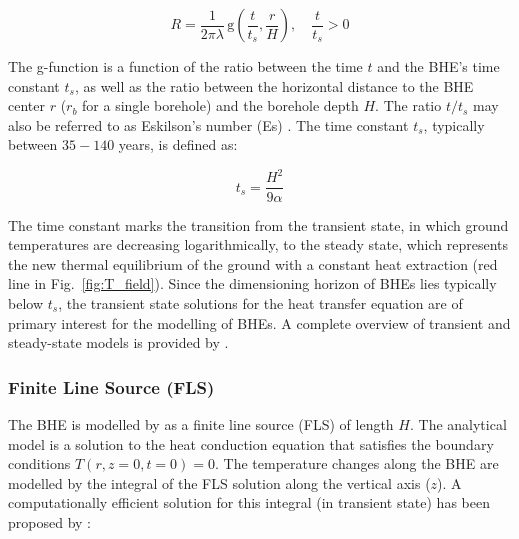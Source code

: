 \begin{equation}
    R = \frac{1}{2 \pi \lambda} \, \mathrm{g}\left( \frac{t}{t_s}, \frac{r}{H} \right), \quad \frac{t}{t_s} > 0
\end{equation}

The g-function is a function of the ratio between the time $t$ and the BHE's time constant $t_s$, as well as the ratio between the horizontal distance to the BHE center $r$ ($r_b$ for a single borehole) and the borehole depth $H$. The ratio $t/t_s$ may also be referred to as Eskilson's number (Es) \citep{pahud_geothermal_2002}. 
The time constant $t_s$, typically between $35-140$ years, is defined as:

\begin{equation}
    t_s = \frac{H^2}{9 \alpha}
\end{equation}

The time constant marks the transition from the transient state, in which ground temperatures are decreasing logarithmically, to the steady state, which represents the new thermal equilibrium of the ground with a constant heat extraction (red line in Fig.~\ref{fig:T_field}).
Since the dimensioning horizon of BHEs lies typically below $t_s$, the transient state solutions for the heat transfer equation are of primary interest for the modelling of BHEs. A complete overview of transient and steady-state models is provided by \citet{pahud_geothermal_2002}.

\subsubsection{Finite Line Source (FLS)}
The BHE is modelled by \citet{claesson_conductive_1988} as a finite line source (FLS) of length $H$. The analytical model is
a solution to the heat conduction equation that satisfies the boundary conditions $T(r, z=0, t=0) = 0$. 
The temperature changes along the BHE are modelled by the integral of the FLS solution along the vertical axis ($z$).
A computationally efficient solution for this integral (in transient state) has been proposed by \citet{claesson_analytical_2011}:

